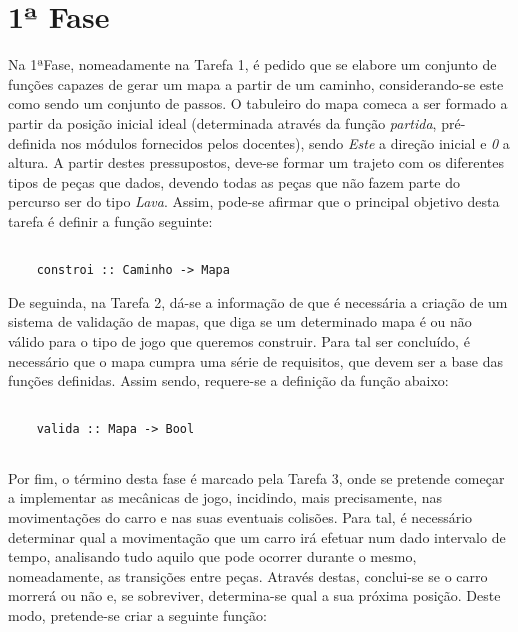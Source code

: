 \documentclass[a4paper]{report} %
\begin{document}
  \section{1ª Fase}
  \label{sec:analisefase1}

  Na 1ªFase, nomeadamente na Tarefa 1, é pedido que se elabore um conjunto de funções capazes de gerar um mapa a partir de um caminho, considerando-se este como sendo um conjunto de passos. O tabuleiro do mapa comeca a ser formado a partir da posição inicial ideal (determinada através da função \textit{partida}, pré-definida nos módulos fornecidos pelos docentes), sendo \textit{Este} a direção inicial e \textit{0} a altura. A partir destes pressupostos, deve-se formar um trajeto com os diferentes tipos de peças que dados, devendo todas as peças que não fazem parte do percurso ser do tipo \textit{Lava}. Assim, pode-se afirmar que o principal objetivo desta tarefa é definir a função seguinte:

  \begin{verbatim}
   
    constroi :: Caminho -> Mapa

  \end{verbatim}

  \par \noindent De seguinda, na Tarefa 2, dá-se a informação de que é necessária a criação de um sistema de validação de mapas, que diga se um determinado mapa é ou não válido para o tipo de jogo que queremos construir. Para tal ser concluído, é necessário que o mapa cumpra uma série de requisitos, que devem ser a base das funções definidas. Assim sendo, requere-se a definição da função abaixo:

  \begin{verbatim}
    
    valida :: Mapa -> Bool 
    
  \end{verbatim}
  
  \par \noindent Por fim, o término desta fase é marcado pela Tarefa 3, onde se pretende começar a implementar as mecânicas de jogo, incidindo, mais precisamente, nas movimentações do carro e nas suas eventuais colisões. Para tal, é necessário determinar qual a movimentação que um carro irá efetuar num dado intervalo de tempo, analisando tudo aquilo que pode ocorrer durante o mesmo, nomeadamente, as transições entre peças. Através destas, conclui-se se o carro morrerá ou não e, se sobreviver, determina-se qual a sua próxima posição. Deste modo, pretende-se criar a seguinte função: 
\end{document}

